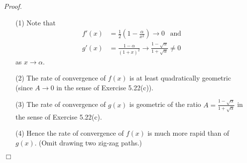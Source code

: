 \documentclass{article}
\begin{document}
\emph{Proof.}
\begin{enumerate}
\item[(1)]
Note that
\begin{align*}
  f'(x) &= \frac{1}{2} \left(1-\frac{\alpha}{x^2}\right) \to 0 \:\: \text{ and } \\
  g'(x) &= \frac{1-\alpha}{(1+x)^2} \to \frac{1-\sqrt{\alpha}}{1+\sqrt{\alpha}} \neq 0
\end{align*}
as $x \to \alpha$.

\item[(2)]
The rate of convergence of $f(x)$ is
at least quadratically geometric (since $A \to 0$ in the sense of Exercise 5.22(c)).

\item[(3)]
The rate of convergence of $g(x)$ is geometric
of the ratio $A = \frac{1-\sqrt{\alpha}}{1+\sqrt{\alpha}}$ in the sense of Exercise 5.22(c).

\item[(4)]
Hence the rate of convergence of $f(x)$ is much more rapid than of $g(x)$.
(Omit drawing two zig-zag paths.)
\end{enumerate}

$\Box$ \\\\


\end{document}
